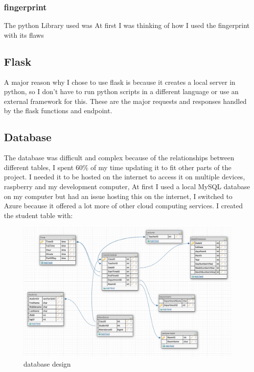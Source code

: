 \subsubsection{fingerprint}
The python Library used was 
At first I was thinking of 
how I used the fingerprint with its flaws

\subsection{Flask}
A major reason why I chose to use flask is because it creates a local server in python, so I don't have to run python scripts in a different language or use an external framework for this.
These are the major requests and responses handled by the flask functions and endpoint.



\subsection{Database}
The database was difficult and complex because of the relationships between different tables, I spent 60\% of my time updating it to fit other parts of the project. I needed it to be hosted on the internet to access it on multiple devices, raspberry and my development computer, At first I used a local MySQL database on my computer but had an issue hosting this on the internet, I switched to Azure because it offered a lot more of other cloud computing services. I created the student table with:

\begin{figure}[ht]
  \includegraphics[scale=0.4]{Design & Implementation/images/database_design.png}
  \caption{database design}
\end{figure}
